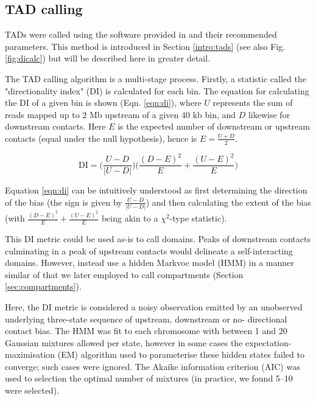 \documentclass[a4paper,11pt,oneside]{book}
\begin{document}
\subsection{TAD calling}\label{meth:tadcalling}

TADs were called using the software provided in
\citet{Dixon2012} and their recommended parameters. This method is introduced in Section \ref{intro:tads} (see also Fig. \ref{fig:dicalc}) but will be described here in greater detail.

The TAD calling algorithm is a multi-stage process. Firstly, a statistic called the "directionality index" (DI) is calculated for each bin.\cite{Dixon2012} The equation for calculating the DI of a given bin is shown (Eqn. \ref{eqn:di}), where $U$ represents the sum of reads mapped up to $2$ Mb upstream of a given $40$ kb bin, and $D$ likewise for downstream contacts. Here $E$ is the expected number of downstream or upstream contacts (equal under the null hypothesis), hence is $E = \frac{U + D}{2}$. 

\begin{equation}\label{eqn:di}
\mathrm{DI} = \bigg(\frac{U - D}{|U - D|}\bigg)\bigg(\frac{(D - E)^2}{E} + \frac{(U - E)^2}{E}\bigg)
\end{equation}\vspace{.2em}

Equation \ref{eqn:di} can be intuitively understood as first determining the direction of the bias (the sign is given by $\frac{U - D}{|U - D|}$) and then calculating the extent of the bias (with $\frac{(D - E)^2}{E} + \frac{(U - E)^2}{E}$ being akin to a $\chi^2$-type statistic).\cite{Dixon2012}

This DI metric could be used as-is to call domains. Peaks of downstream contacts culminating in a peak of upstream contacts would delineate a self-interacting domains. However, \citet{Dixon2012} instead use a hidden Markvoc model (HMM) in a manner similar of that we later employed to call compartments (Section \ref{sec:compartments}). 

Here, the DI metric is considered a noisy observation emitted by an unobserved underlying three-state sequence of upstream, downstream or no- directional contact bias.\cite{Dixon2012} The HMM was fit to each chromosome with between 1 and 20 Gaussian mixtures allowed per state, however in some cases the expectation-maximisation (EM) algorithm used to parameterise these hidden states failed to converge; such cases were ignored. The Akaike information criterion (AIC) was used to selection the optimal number of mixtures (in practice, we found 5--10 were selected). 
\end{document}
